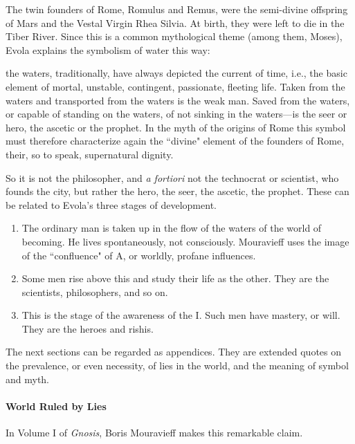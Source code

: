 The twin founders of Rome, Romulus and Remus, were the semi-divine offspring of Mars and the Vestal Virgin Rhea Silvia. At birth, they were left to die in the Tiber River. Since this is a common mythological theme (among them, Moses), Evola explains the symbolism of water this way:

\begin{quotex}
the waters, traditionally, have always depicted the current of time, i.e., the basic element of mortal, unstable, contingent, passionate, fleeting life. Taken from the waters and transported from the waters is the weak man. Saved from the waters, or capable of standing on the waters, of not sinking in the waters—is the seer or hero, the ascetic or the prophet. In the myth of the origins of Rome this symbol must therefore characterize again the ``divine" element of the founders of Rome, their, so to speak, supernatural dignity. 

\end{quotex}
So it is not the philosopher, and \emph{a fortiori} not the technocrat or scientist, who founds the city, but rather the hero, the seer, the ascetic, the prophet. These can be related to Evola's three stages of development.

\begin{enumerate}
\item The ordinary man is taken up in the flow of the waters of the world of becoming. He lives spontaneously, not consciously. Mouravieff uses the image of the ``confluence" of A, or worldly, profane influences. 
\item Some men rise above this and study their life as the other. They are the scientists, philosophers, and so on. 
\item This is the stage of the awareness of the I. Such men have mastery, or will. They are the heroes and rishis. 
\end{enumerate}
The next sections can be regarded as appendices. They are extended quotes on the prevalence, or even necessity, of lies in the world, and the meaning of symbol and myth.

\paragraph{World Ruled by Lies}
In Volume I of \emph{Gnosis}, Boris Mouravieff makes this remarkable claim.

